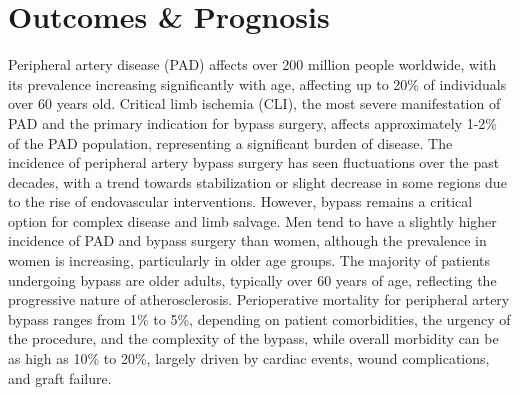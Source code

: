 \section*{Outcomes \& Prognosis}
Peripheral artery disease (PAD) affects over 200 million people worldwide, with its prevalence increasing significantly with age, affecting up to 20\% of individuals over 60 years old. Critical limb ischemia (CLI), the most severe manifestation of PAD and the primary indication for bypass surgery, affects approximately 1-2\% of the PAD population, representing a significant burden of disease. The incidence of peripheral artery bypass surgery has seen fluctuations over the past decades, with a trend towards stabilization or slight decrease in some regions due to the rise of endovascular interventions. However, bypass remains a critical option for complex disease and limb salvage. Men tend to have a slightly higher incidence of PAD and bypass surgery than women, although the prevalence in women is increasing, particularly in older age groups. The majority of patients undergoing bypass are older adults, typically over 60 years of age, reflecting the progressive nature of atherosclerosis. Perioperative mortality for peripheral artery bypass ranges from 1\% to 5\%, depending on patient comorbidities, the urgency of the procedure, and the complexity of the bypass, while overall morbidity can be as high as 10\% to 20\%, largely driven by cardiac events, wound complications, and graft failure.

